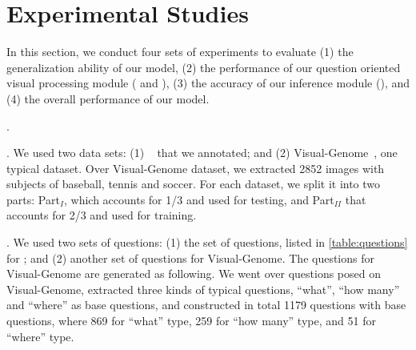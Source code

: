 
\section{Experimental Studies}
\label{sec-expt}

In this section, we conduct four sets of experiments to evaluate (1) the generalization ability of our model, (2) the performance of our question oriented visual processing module ( and ), (3) the accuracy of our inference module (), and (4) the overall performance of our model. 

. %

. We used two data sets: (1) ~\cite{peixi2019} that we annotated; and (2) Visual-Genome~\cite{visualgenome}, one typical \vqa dataset. Over Visual-Genome dataset, we extracted 2852 images with subjects of baseball, tennis and soccer. 
For each dataset, we split it into two parts: Part$_I$, which accounts for 1/3 and used for testing, and Part$_{II}$ that accounts for 2/3 and used for training.   

. We used two sets of questions: (1) the set of questions, listed in \cref{table:questions} for ; and (2) another set of questions for Visual-Genome. The questions for Visual-Genome are generated as following. We went over questions posed on Visual-Genome, extracted three kinds of typical questions, \ie ``what'', ``how many'' and ``where'' as base questions, and constructed in total 1179 questions with base questions, where 869 for ``what'' type, 259 for ``how many'' type, and 51 for ``where'' type. 

